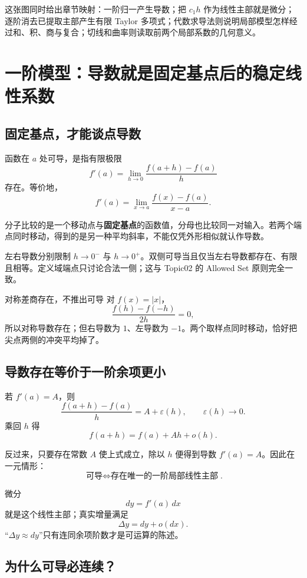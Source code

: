 \documentclass[11pt,a4paper]{ctexart}
\begin{document}
这张图同时给出章节映射：一阶归一产生导数；把 $c_1h$ 作为线性主部就是微分；逐阶消去已提取主部产生有限 Taylor 多项式；代数求导法则说明局部模型怎样经过和、积、商与复合；切线和曲率则读取前两个局部系数的几何意义。

\section{一阶模型：导数就是固定基点后的稳定线性系数}

\subsection{固定基点，才能谈点导数}

函数在 $a$ 处可导，是指有限极限
\[
f'(a)=\lim_{h\to0}\frac{f(a+h)-f(a)}{h}
\]
存在。等价地，
\[
f'(a)=\lim_{x\to a}\frac{f(x)-f(a)}{x-a}.
\]

分子比较的是一个移动点与\textbf{固定基点}的函数值，分母也比较同一对输入。若两个端点同时移动，得到的是另一种平均斜率，不能仅凭外形相似就认作导数。

左右导数分别限制 $h\to0^-$ 与 $h\to0^+$。双侧可导当且仅当左右导数都存在、有限且相等。定义域端点只讨论合法一侧；这与 Topic02 的 Allowed Set 原则完全一致。

\begin{warnbox}{对称差商存在，不推出可导}
对 $f(x)=\lvert x\rvert$，
\[
\frac{f(h)-f(-h)}{2h}=0,
\]
所以对称导数存在；但右导数为 $1$、左导数为 $-1$。两个取样点同时移动，恰好把尖点两侧的冲突平均掉了。
\end{warnbox}

\subsection{导数存在等价于一阶余项更小}

若 $f'(a)=A$，则
\[
\frac{f(a+h)-f(a)}{h}=A+\varepsilon(h),
\qquad \varepsilon(h)\to0.
\]
乘回 $h$ 得
\[
\boxed{f(a+h)=f(a)+Ah+o(h)}.
\]

反过来，只要存在常数 $A$ 使上式成立，除以 $h$ 便得到导数 $f'(a)=A$。因此在一元情形：
\[
\boxed{\text{可导}\iff\text{存在唯一的一阶局部线性主部}}.
\]

微分
\[
dy=f'(a)\,dx
\]
就是这个线性主部；真实增量满足
\[
\Delta y=dy+o(dx).
\]
“$\Delta y\approx dy$”只有连同余项阶数才是可运算的陈述。

\subsection{为什么可导必连续？}
\end{document}
